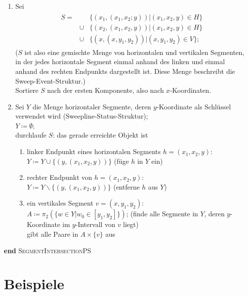 \documentclass[ngerman,draft,parskip=half*,twoside]{scrreprt}
\theoremstyle{break}
\begin{document}
\begin{enumerate}
\item
Sei \begin{gather*}
  \begin{array}{rcl}
  S =&& \{(x_1, (x_1,x_2;y)) | (x_1,x_2,y)\in H\}\\
  &\cup& \{(x_2,(x_1,x_2,y)) | (x_1,x_2,y)\in H\}\\
  &\cup& \{(x,(x,y_1,y_2)) | (x,y_1,y_2)\in V\};
\end{array}
\end{gather*}
($S$ ist also eine gemischte Menge von horizontalen und vertikalen Segmenten,
in der jedes horizontale Segment einmal anhand des linken und einmal
anhand des rechten Endpunkts dargestellt ist. Diese Menge beschreibt die
Sweep-Event-Struktur.)\\
Sortiere $S$ nach der ersten Komponente, also nach $x$-Koordinaten.

\item
Sei $Y$ die Menge horizontaler Segmente, deren $y$-Koordinate als
Schlüssel verwendet wird (Sweepline-Status-Struktur);\\
$Y\coloneqq\emptyset$;\\
durchlaufe $S$: das gerade erreichte Objekt ist
\begin{enumerate}
\item
linker Endpunkt eines horizontalen Segments $h=(x_1,x_2,y)$:\\
$Y \coloneqq Y \cup \{(y,(x_1,x_2,y))\}$ (füge $h$ in $Y$ ein)
\item
rechter Endpunkt von $h=(x_1,x_2,y)$:\\
$Y \coloneqq Y \backslash \{(y,(x_1,x_2,y))\}$ (entferne $h$ aus $Y$)
\item
ein vertikales Segment $v=(x,y_1,y_2)$:\\
$A \coloneqq\pi_2 (\{w\in Y | w_0 \in [y_1,y_2] \})$;
 \hspace{1cm}  (finde alle Segmente in $Y$, deren
   $y$-Koordinate im $y$-Intervall von $v$ liegt)\\
gibt alle Paare in $A\times\{v\}$ aus
\end{enumerate}
\end{enumerate}
\textbf{end} \textsc{SegmentIntersectionPS} 

\chapter{Beispiele}
\end{document}
